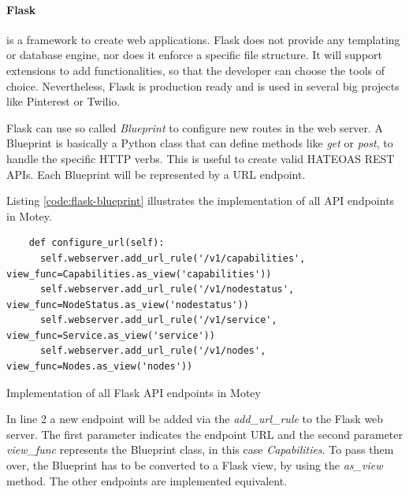 \paragraph{Flask} is a framework to create web applications.
Flask does not provide any templating or database engine, nor does it enforce a specific file structure.
It will support extensions to add functionalities, so that the developer can choose the tools of choice.\autocite[cf.]{Flask:Documentation:Foreword}
Nevertheless, Flask is production ready and is used in several big projects like Pinterest\autocite{Quora:Pinterest:Flask} or Twilio\autocite{Twilio:Flask}.

Flask can use so called \textit{Blueprint} to configure new routes in the web server.
A Blueprint is basically a Python class that can define methods like \textit{get} or \textit{post}, to handle the specific \ac{HTTP} verbs.
This is useful to create valid \ac{HATEOAS} \ac{REST} \acp{API}.
Each Blueprint will be represented by a \ac{URL} endpoint.

Listing \ref{code:flask-blueprint} illustrates the implementation of all \ac{API} endpoints in Motey.
\begin{listing}[H]
  \begin{verbatim}
    def configure_url(self):
      self.webserver.add_url_rule('/v1/capabilities', view_func=Capabilities.as_view('capabilities'))
      self.webserver.add_url_rule('/v1/nodestatus', view_func=NodeStatus.as_view('nodestatus'))
      self.webserver.add_url_rule('/v1/service', view_func=Service.as_view('service'))
      self.webserver.add_url_rule('/v1/nodes', view_func=Nodes.as_view('nodes'))
  \end{verbatim}
  \caption[Implementation of all Flask API endpoints in Motey]{Implementation of all Flask \ac{API} endpoints in Motey}
  \label{code:flask-blueprint}
\end{listing}

In line 2 a new endpoint will be added via the \textit{add\_url\_rule} to the Flask web server.
The first parameter indicates the endpoint \ac{URL} and the second parameter \textit{view\_func} represents the Blueprint class, in this case \textit{Capabilities}.
To pass them over, the Blueprint has to be converted to a Flask view, by using the \textit{as\_view} method.
The other endpoints are implemented equivalent.

